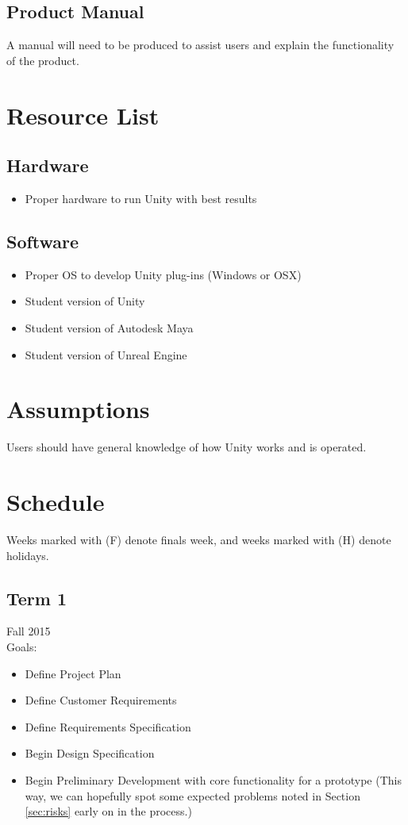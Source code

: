 \documentclass[12pt]{article}
\begin{document}
\subsection{Product Manual} 
A manual will need to be produced to assist users and explain the functionality of the product.


\section{Resource List}
\label{sec:resource}
\subsection{Hardware}
\begin{itemize}
  \item Proper hardware to run Unity with best results
\end{itemize}

\subsection{Software}
\begin{itemize}
  \item Proper OS to develop Unity plug-ins (Windows or OSX)
  \item Student version of Unity
  \item Student version of Autodesk Maya
  \item Student version of Unreal Engine
\end{itemize}

\section{Assumptions}
\label{sec:assumptions}
Users should have general knowledge of how Unity works and is operated.

\section{Schedule}
\label{sec:schedule}
Weeks marked with (F) denote finals week, and weeks marked with (H) denote holidays.

\subsection{Term 1}
Fall 2015 \\
Goals:
\begin{itemize}
	\item Define Project Plan
	\item Define Customer Requirements
	\item Define Requirements Specification
	\item Begin Design Specification
	\item Begin Preliminary Development with core functionality for a prototype (This way, we can hopefully spot some expected problems noted in Section \ref{sec:risks} early on in the process.)
\end{itemize}
\end{document}
